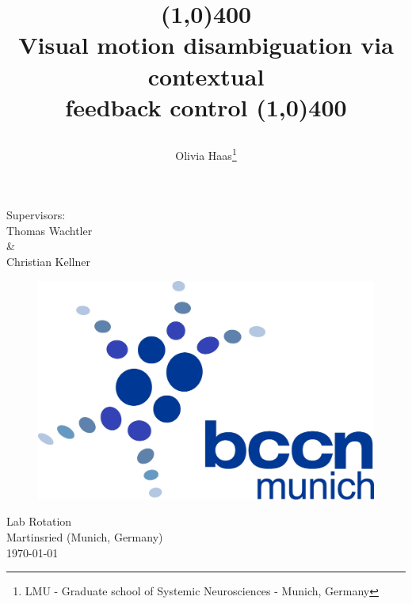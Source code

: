 \documentclass[a4paper]{article}
\begin{document}
\begin{titlepage}

\addtolength{\voffset}{-1cm}
\title{ 
\linethickness{0.7mm}
\begin{center}
\line(1,0){400}\vspace{0.5cm}\\
\textbf{Visual motion disambiguation via contextual \\
		feedback control}
\line(1,0){400}\vspace{1cm}
\end{center}}
\author{Olivia Haas\thanks{LMU - Graduate school of Systemic Neurosciences - Munich, Germany}}
\date{}


\maketitle
\begin{center}
Supervisors:\\
\vspace{1mm}
Thomas Wachtler\\
\&\\
Christian Kellner\\

\vspace{0.5cm}
\begin{figure}[ht]
\centering
\includegraphics[scale=0.20]{BCCN}
\end{figure}
\vspace{0.5cm}

Lab Rotation\\
Martinsried (Munich, Germany)\\
\today\\


\end{center}
\end{titlepage}
\end{document}
